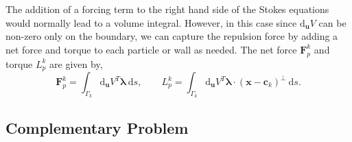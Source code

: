 \documentclass[preprint, 10pt]{elsarticle}
\begin{document}
The addition of a forcing term to the right hand side of the Stokes equations would normally lead to a volume integral. However, in this case since $\text{d}_{\mathbf{u}} V$ can be non-zero only on the boundary, we can capture the repulsion force by adding a net force and torque to each particle or wall as needed. The net force $\mathbf{F}^k_p$ and torque $L^k_p$ are given by,
\[ \mathbf{F}^k_p = \int_{\Gamma_k} \text{d}_\mathbf{u}V^T\pmb{\lambda}~\text{d}s, \qquad L_p^k = \int_{\Gamma_k}  \text{d}_\mathbf{u}V^T\pmb{\lambda}\cdot(\mathbf{x}-\mathbf{c}_k)^\perp~\text{d}s.\]

\subsection{Complementary Problem}
\end{document}
